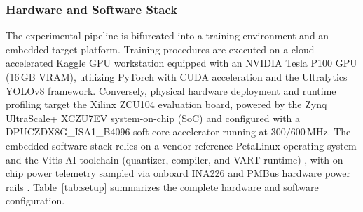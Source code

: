 \documentclass[algorithms,article,submit,moreauthors]{Definitions/mdpi}
\begin{document}
\subsubsection{Hardware and Software Stack}

The experimental pipeline is bifurcated into a training environment and an embedded target platform. Training procedures are executed on a cloud-accelerated Kaggle GPU workstation equipped with an NVIDIA Tesla P100 GPU (16\,GB VRAM), utilizing PyTorch with CUDA acceleration and the Ultralytics YOLOv8 framework. Conversely, physical hardware deployment and runtime profiling target the Xilinx ZCU104 evaluation board, powered by the Zynq UltraScale+ XCZU7EV system-on-chip (SoC) \citep{bib2} and configured with a DPUCZDX8G\_ISA1\_B4096 soft-core accelerator running at $300/600\,$MHz. The embedded software stack relies on a vendor-reference PetaLinux operating system and the Vitis AI toolchain (quantizer, compiler, and VART runtime) \citep{bib1}, with on-chip power telemetry sampled via onboard INA226 and PMBus hardware power rails \citep{bib3}. Table~\ref{tab:setup} summarizes the complete hardware and software configuration.

\begin{table}[h!]
\centering
\caption{Hardware and software configuration for training and edge deployment.}
\label{tab:setup}
\end{table}
\end{document}
